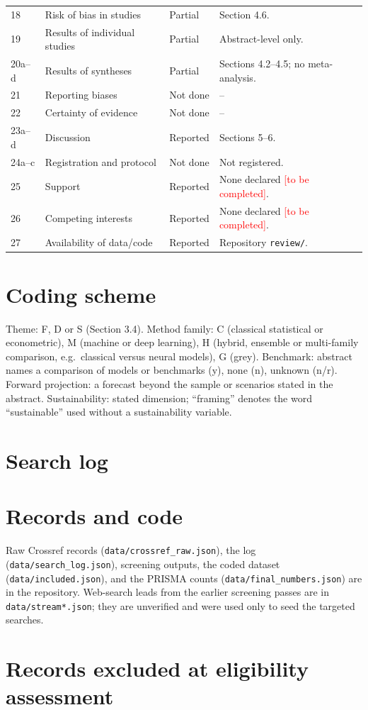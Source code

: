 \documentclass[11pt,a4paper]{article}
\newcommand{\tbd}{\textcolor{red}{[to be completed]}}
\begin{document}
\begin{longtable}{@{}p{1.1cm}p{5.2cm}p{2.0cm}p{6.5cm}@{}}
18 & Risk of bias in studies & Partial & Section 4.6.\\
19 & Results of individual studies & Partial & Abstract-level only.\\
20a--d & Results of syntheses & Partial & Sections 4.2--4.5; no meta-analysis.\\
21 & Reporting biases & Not done & --\\
22 & Certainty of evidence & Not done & --\\
23a--d & Discussion & Reported & Sections 5--6.\\
24a--c & Registration and protocol & Not done & Not registered.\\
25 & Support & Reported & None declared \tbd.\\
26 & Competing interests & Reported & None declared \tbd.\\
27 & Availability of data/code & Reported & Repository \texttt{review/}.\\
\bottomrule
\end{longtable}

\normalsize
\section{Coding scheme}
Theme: F, D or S (Section 3.4). Method family: C (classical statistical or econometric), M (machine or deep learning), H (hybrid, ensemble or multi-family comparison, e.g.\ classical versus neural models), G (grey). Benchmark: abstract names a comparison of models or benchmarks (y), none (n), unknown (n/r). Forward projection: a forecast beyond the sample or scenarios stated in the abstract. Sustainability: stated dimension; ``framing'' denotes the word ``sustainable'' used without a sustainability variable.

\section{Search log}\small


\normalsize
\section{Records and code}
Raw Crossref records (\texttt{data/crossref\_raw.json}), the log (\texttt{data/search\_log.json}), screening outputs, the coded dataset (\texttt{data/included.json}), and the PRISMA counts (\texttt{data/final\_numbers.json}) are in the repository. Web-search leads from the earlier screening passes are in \texttt{data/stream*.json}; they are unverified and were used only to seed the targeted searches.

\section{Records excluded at eligibility assessment}\scriptsize

\end{document}
